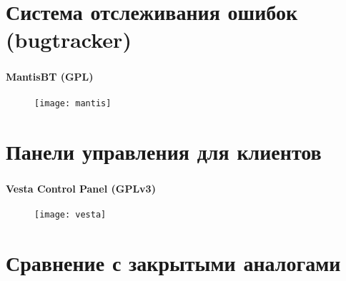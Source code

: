 
\section{Система отслеживания ошибок (bugtracker)}

\begin{frame}
\frametitle{\insertsection}
\framesubtitle{MantisBT (GPL)}
\begin{figure}[h]
	\begin{center}
		\texttt{[image: mantis]}
	\end{center}
\end{figure}
\end{frame}


\section{Панели управления для клиентов}

\begin{frame}
\frametitle{\insertsection}
\framesubtitle{Vesta Control Panel (GPLv3)}
\begin{figure}[h]
	\begin{center}
		\texttt{[image: vesta]}
	\end{center}
\end{figure}
\end{frame}


\section{Сравнение с закрытыми аналогами}

